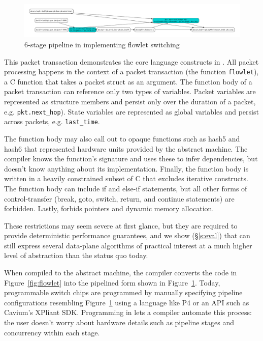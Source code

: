 \begin{figure}[!t]
  \includegraphics[width=\textwidth]{pipe.pdf}
  \caption{6-stage pipeline in \absmachine implementing flowlet switching}
  \label{fig:pipeline}
\end{figure}

This packet transaction demonstrates the core language constructs in
\pktlanguage. All packet processing happens in the context of a packet
transaction (the function \texttt{flowlet}), a C function that takes a packet
struct as an argument. The function body of a packet transaction can reference
only two types of variables. Packet variables are represented as structure
members and persist only over the duration of a packet, e.g.
\texttt{pkt.next\_hop}). State variables are represented as global variables
and persist across packets, e.g. \texttt{last\_time}.

The function body may also call out to opaque functions such as hash5 and hash6
that represented hardware units provided by the abstract machine. The
\pktlanguage compiler knows the function's signature and uses these to infer
dependencies, but doesn't know anything about its implementation. Finally, the
function body is written in a heavily constrained subset of C that excludes
iterative constructs. The function body can include if and else-if statements,
but all other forms of control-transfer (break, goto, switch, return, and
continue statements) are forbidden. Lastly, \pktlanguage forbids pointers and
dynamic memory allocation.

These restrictions may seem severe at first glance, but they are required to
provide deterministic performance guarantees, and we show (\S\ref{s:eval}) that
\pktlanguage can still express several data-plane algorithms  of practical
interest at a much higher level of abstraction than the status quo today.

When compiled to the \absmachine abstract machine, the \pktlanguage compiler
converts the code in Figure~\ref{fig:flowlet} into the pipelined form shown in
Figure~\ref{fig:pipeline}. Today, programmable switch chips are programmed by
manually specifying pipeline configurations resembling
Figure~\ref{fig:pipeline} using a language like P4 or an API such as Cavium's
XPliant SDK. Programming in \pktlanguage lets a compiler automate this process:
the user doesn't worry about hardware details such as pipeline stages and
concurrency within each stage.


